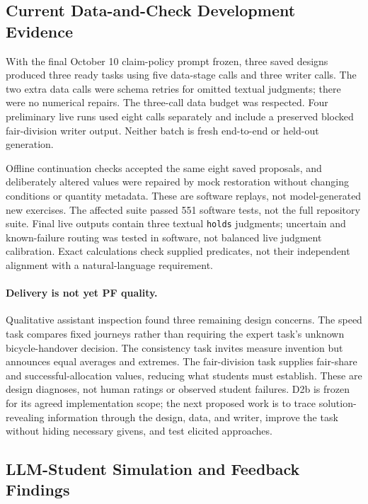 \subsection{Current Data-and-Check Development Evidence}

With the final October 10 claim-policy prompt frozen, three saved designs produced three ready tasks using five data-stage calls and three writer calls. The two extra data calls were schema retries for omitted textual judgments; there were no numerical repairs. The three-call data budget was respected. Four preliminary live runs used eight calls separately and include a preserved blocked fair-division writer output. Neither batch is fresh end-to-end or held-out generation.

Offline continuation checks accepted the same eight saved proposals, and deliberately altered values were repaired by mock restoration without changing conditions or quantity metadata. These are software replays, not model-generated new exercises. The affected suite passed 551 software tests, not the full repository suite. Final live outputs contain three textual \texttt{holds} judgments; uncertain and known-failure routing was tested in software, not balanced live judgment calibration. Exact calculations check supplied predicates, not their independent alignment with a natural-language requirement.

\paragraph{Delivery is not yet PF quality.} Qualitative assistant inspection found three remaining design concerns. The speed task compares fixed journeys rather than requiring the expert task's unknown bicycle-handover decision. The consistency task invites measure invention but announces equal averages and extremes. The fair-division task supplies fair-share and successful-allocation values, reducing what students must establish. These are design diagnoses, not human ratings or observed student failures. D2b is frozen for its agreed implementation scope; the next proposed work is to trace solution-revealing information through the design, data, and writer, improve the task without hiding necessary givens, and test elicited approaches.

\subsection{LLM-Student Simulation and Feedback Findings}
\label{sec:student-feedback-results}

